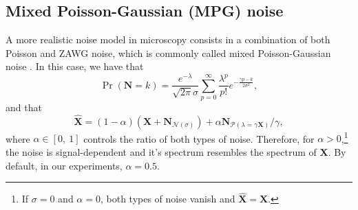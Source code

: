 \documentclass{article}
\begin{document}

\subsection{Mixed Poisson-Gaussian (MPG) noise}

A more realistic noise model in microscopy consists in a combination
of both Poisson and ZAWG noise, which is commonly called mixed
Poisson-Gaussian noise \cite{meiniel2018denoising}. In this
case, we have that
\begin{equation}
  \Pr({\mathbf N}{=}k) = \frac{e^{-\lambda}}{\sqrt{2\pi}\sigma}\sum_{p=0}^{\infty}\frac{\lambda^p}{p!} e^{-\frac{\gamma p - k}{2\sigma^2}},
  \label{eq:PN}
\end{equation}
and that
\begin{equation}
  \hat{\mathbf X} = (1-\alpha)(\mathbf{X} + {\mathbf N}_{\mathcal{N}(\sigma)}) + \alpha{\mathbf N}_{\mathcal{P}(\lambda=\gamma\mathbf{X})}/\gamma,
  \label{eq:MPG_noise_model} 
\end{equation}
where $\alpha\in[0,~1]$ controls the ratio of both types of
noise. Therefore, for $\alpha > 0$,\footnote{If $\sigma=0$ and
  $\alpha=0$, both types of noise vanish and
  $\hat{\mathbf{X}}=\mathbf{X}$.} the noise is signal-dependent and
it's spectrum resembles the spectrum of $\mathbf{X}$. By default, in
our experiments, $\alpha=0.5$.







\end{document}
